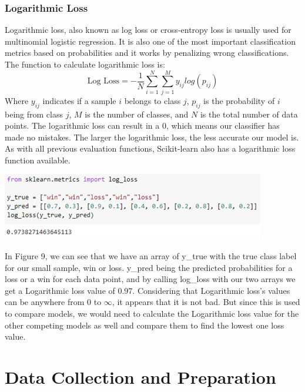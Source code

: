 \documentclass[a4paper,12pt]{report}
\begin{document}
\subsubsection{Logarithmic Loss}

Logarithmic loss, also known as log loss or cross-entropy loss is usually used for multinomial logistic regression. It is also one of the most important classification metrics based on probabilities and it works by penalizing wrong classifications. The function to calculate logarithmic loss is:
$$\text{Log Loss} = -\frac{1}{N}\sum_{i=1}^N\sum_{j=1}^My_{ij}log(p_{ij})$$
Where $y_{ij}$ indicates if a sample $i$ belongs to class $j$, $p_{ij}$ is the probability of $i$ being from class $j$, $M$ is the number of classes, and $N$ is the total number of data points. The logarithmic loss can result in a 0, which means our classifier has made no mistakes. The larger the logarithmic loss, the less accurate our model is. As with all previous evaluation functions, Scikit-learn also has a logarithmic loss function available.

\begin{center}
    \captionsetup{type=figure}
    \includegraphics[width=.9\linewidth]{media/LogLosscode.png}
\end{center}

In Figure 9, we can see that we have an array of y\_true with the true class label for our small sample, win or loss. y\_pred being the predicted probabilities for a loss or a win for each data point, and by calling log\_loss with our two arrays we get a Logarithmic loss value of 0.97. Considering that Logarithmic loss’s values can be anywhere from 0 to $\infty$, it appears that it is not bad. But since this is used to compare models, we would need to calculate the Logarithmic loss value for the other competing models as well and compare them to find the lowest one loss value.

\section{Data Collection and Preparation}
\end{document}
